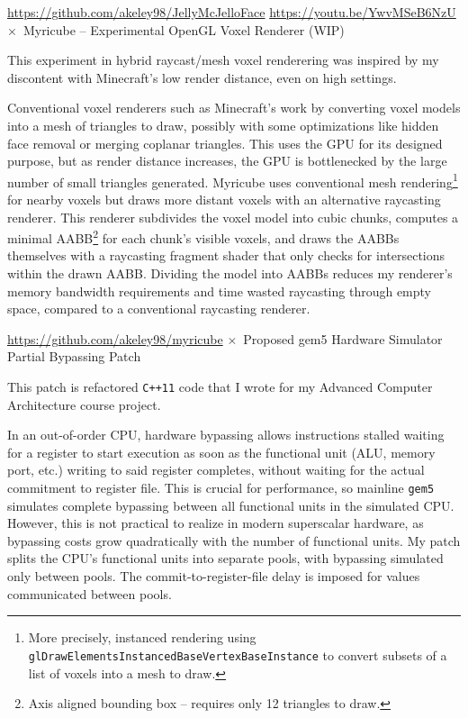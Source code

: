 \documentclass[11pt]{article}
\newcommand{\web}[1]{{ \color{webColor} \small \url{#1}}}
\newcommand{\mySub}[1]{{\color{subColor}\hspace{-6mm} \( \times \)\ \textsf{#1}}}
\begin{document}
\web{https://github.com/akeley98/JellyMcJelloFace}
\hfill\web{https://youtu.be/YwvMSeB6NzU}
\filbreak
\mySub{Myricube -- Experimental OpenGL Voxel Renderer (WIP)}

This experiment in hybrid raycast/mesh voxel renderering was inspired
by my discontent with Minecraft's low render distance, even on high
settings.

Conventional voxel renderers such as Minecraft's work by converting
voxel models into a mesh of triangles to draw, possibly with some
optimizations like hidden face removal or merging coplanar
triangles. This uses the GPU for its designed purpose, but as render
distance increases, the GPU is bottlenecked by the large number of
small triangles generated. Myricube uses conventional mesh
rendering\footnote{More precisely, instanced rendering using
  \texttt{glDrawElementsInstancedBaseVertexBaseInstance} to convert
  subsets of a list of voxels into a mesh to draw.} for nearby voxels
but draws more distant voxels with an alternative raycasting
renderer. This renderer subdivides the voxel model into cubic chunks,
computes a minimal AABB\footnote{Axis aligned bounding box -- requires
  only 12 triangles to draw.} for each chunk's visible voxels, and
draws the AABBs themselves with a raycasting fragment shader that only
checks for intersections within the drawn AABB.  Dividing the model
into AABBs reduces my renderer's memory bandwidth requirements and
time wasted raycasting through empty space, compared to a conventional
raycasting renderer.

\web{https://github.com/akeley98/myricube}
\filbreak
\mySub{Proposed gem5 Hardware Simulator Partial Bypassing Patch}

This patch is refactored \texttt{C++11} code that I wrote for my
Advanced Computer Architecture course project.

In an out-of-order CPU, hardware bypassing allows instructions stalled
waiting for a register to start execution as soon as the functional
unit (ALU, memory port, etc.) writing to said register completes,
without waiting for the actual commitment to register file. This is
crucial for performance, so mainline \texttt{gem5} simulates complete
bypassing between all functional units in the simulated CPU. However,
this is not practical to realize in modern superscalar hardware, as
bypassing costs grow quadratically with the number of functional
units. My patch splits the CPU's functional units into separate pools,
with bypassing simulated only between pools. The
commit-to-register-file delay is imposed for values communicated
between pools.
\end{document}
